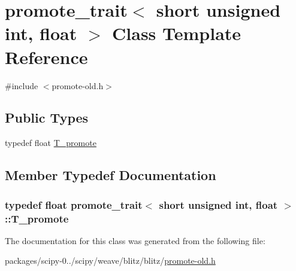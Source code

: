 \hypertarget{classpromote__trait_3_01short_01unsigned_01int_00_01float_01_4}{}\section{promote\+\_\+trait$<$ short unsigned int, float $>$ Class Template Reference}
\label{classpromote__trait_3_01short_01unsigned_01int_00_01float_01_4}


{\ttfamily \#include $<$promote-\/old.\+h$>$}

\subsection*{Public Types}
\begin{DoxyCompactItemize}
\item 
typedef float \hyperlink{classpromote__trait_3_01short_01unsigned_01int_00_01float_01_4_a91484a6ab990d609a44f125f418f1371}{T\+\_\+promote}
\end{DoxyCompactItemize}


\subsection{Member Typedef Documentation}
\hypertarget{classpromote__trait_3_01short_01unsigned_01int_00_01float_01_4_a91484a6ab990d609a44f125f418f1371}{}
\subsubsection[{T\+\_\+promote}]{\setlength{\rightskip}{0pt plus 5cm}typedef float {\bf promote\+\_\+trait}$<$ short unsigned int, float $>$\+::{\bf T\+\_\+promote}}\label{classpromote__trait_3_01short_01unsigned_01int_00_01float_01_4_a91484a6ab990d609a44f125f418f1371}


The documentation for this class was generated from the following file\+:\begin{DoxyCompactItemize}
\item 
packages/scipy-\/0../scipy/weave/blitz/blitz/\hyperlink{promote-old_8h}{promote-\/old.\+h}\end{DoxyCompactItemize}
